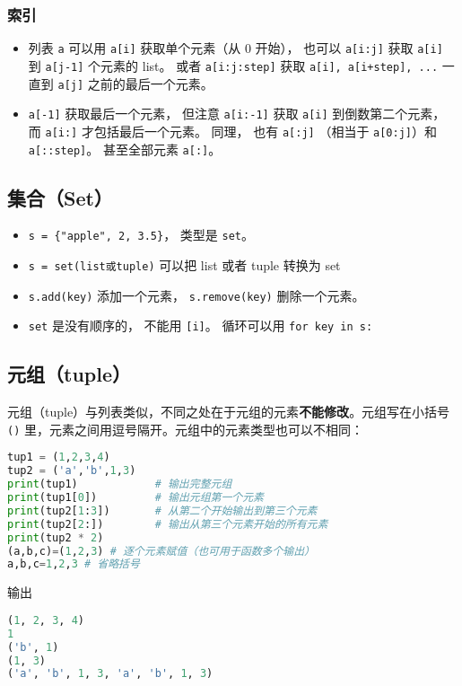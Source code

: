 \subsubsection{索引}
\begin{itemize}
\item 列表 \verb|a| 可以用 \verb|a[i]| 获取单个元素（从 0 开始）， 也可以 \verb|a[i:j]| 获取 \verb|a[i]| 到 \verb|a[j-1]| 个元素的 list。 或者 \verb|a[i:j:step]| 获取 \verb|a[i], a[i+step], ...| 一直到 \verb|a[j]| 之前的最后一个元素。 
\item \verb|a[-1]| 获取最后一个元素， 但注意 \verb|a[i:-1]| 获取 \verb|a[i]| 到倒数第二个元素， 而 \verb|a[i:]| 才包括最后一个元素。 同理， 也有 \verb|a[:j]| （相当于 \verb|a[0:j]|）和 \verb|a[::step]|。 甚至全部元素 \verb|a[:]|。
\end{itemize}


\subsection{集合（Set）}
\begin{itemize}
\item \verb|s = {"apple", 2, 3.5}|， 类型是 \verb|set|。 
\item \verb|s = set(list或tuple)| 可以把 list 或者 tuple 转换为 set
\item \verb|s.add(key)| 添加一个元素， \verb|s.remove(key)| 删除一个元素。
\item \verb|set| 是没有顺序的， 不能用 \verb|[i]|。 循环可以用 \verb|for key in s:|
\end{itemize}


\subsection{元组（tuple）}
元组（tuple）与列表类似，不同之处在于元组的元素\textbf{不能修改}。元组写在小括号 \verb|()| 里，元素之间用逗号隔开。元组中的元素类型也可以不相同：
\begin{lstlisting}[language=python]
tup1 = (1,2,3,4)
tup2 = ('a','b',1,3)
print(tup1)            # 输出完整元组
print(tup1[0])         # 输出元组第一个元素
print(tup2[1:3])       # 从第二个开始输出到第三个元素
print(tup2[2:])        # 输出从第三个元素开始的所有元素
print(tup2 * 2)
(a,b,c)=(1,2,3) # 逐个元素赋值（也可用于函数多个输出）
a,b,c=1,2,3 # 省略括号
\end{lstlisting}
输出
\begin{lstlisting}[language=python]
(1, 2, 3, 4)
1
('b', 1)
(1, 3)
('a', 'b', 1, 3, 'a', 'b', 1, 3)
\end{lstlisting}

